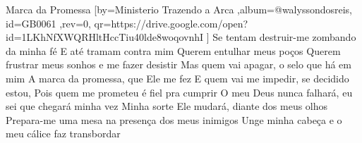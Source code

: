 \beginsong
{Marca da Promessa %
}[by={Ministerio Trazendo a Arca %
},album={@walyssondosreis},
id={GB0061 %
},rev={0}, %
qr={https://drive.google.com/open?id=1LKhNfXWQRHltHccTiu40lde8woqovnhI %
}]
\beginverse*
Se tentam destruir-me zombando da minha fé
E até tramam contra mim
Querem entulhar meus poços
Querem frustrar meus sonhos e me fazer desistir
\endverse
\beginverse*
Mas quem vai apagar, o selo que há em mim
A marca da promessa, que Ele me fez
E quem vai me impedir, se decidido estou,
Pois quem me prometeu é fiel pra cumprir
\endverse
\beginchorus
O meu Deus nunca falhará, eu sei que chegará minha vez
Minha sorte Ele mudará, diante dos meus olhos
\endchorus
\beginverse*
Prepara-me uma mesa na presença dos meus inimigos
Unge minha cabeça e o meu cálice faz transbordar
\endverse
\vspace{4em} %
\begin{comment}
\lstset{basicstyle=\scriptsize\bf} %
\tab{Solo 1}
\begin{lstlisting}
E|-----------------------------------------------------|
B|-----------------------------------------------------|
G|-----------------------------------------------------|
D|-----------------------------------------------------|
A|-----------------------------------------------------|
E|-----------------------------------------------------|
\end{lstlisting}
\end{comment}
 
